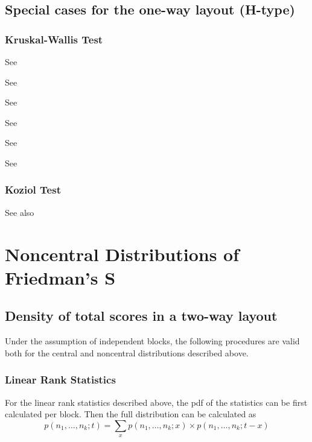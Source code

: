 \subsection{Special cases for the one-way layout (H-type)}
\subsubsection{Kruskal-Wallis Test}
See \cite{Spurrier2003}

See \cite{Robinson_1980}

See \cite{DiBucchianico_2005}

See \cite{vandeWiel_2004}

See \cite{Fan_2011}

See \cite{Fan_2012}

\subsubsection{Koziol Test}


See also \cite{Koziol1982}






\newpage
\section{Noncentral Distributions of Friedman's S}


\subsection{Density of total scores in a two-way layout}
Under the assumption of independent blocks, the following procedures are valid both for the central and noncentral distributions described above.

\subsubsection{Linear Rank Statistics}
For the linear rank statistics described above, the pdf of the statistics can be first calculated per block. Then the full distribution can be calculated as
\begin{equation} 
	p(n_1,\ldots,n_k; t) = \sum_{x} p(n_1,\ldots,n_k; x) \times p(n_1,\ldots,n_k; t-x)
\end{equation}



